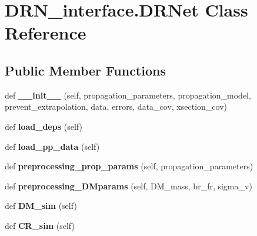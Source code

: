\hypertarget{classDRN__interface_1_1DRNet}{}\section{D\+R\+N\+\_\+interface.\+D\+R\+Net Class Reference}
\label{classDRN__interface_1_1DRNet}
\subsection*{Public Member Functions}
\begin{DoxyCompactItemize}
\item 
\mbox{\label{classDRN__interface_1_1DRNet_a24305a7981aef4f74f6ae0ae8a316218}} 
def {\bfseries \+\_\+\+\_\+init\+\_\+\+\_\+} (self, propagation\+\_\+parameters, propagation\+\_\+model, prevent\+\_\+extrapolation, data, errors, data\+\_\+cov, xsection\+\_\+cov)
\item 
\mbox{\label{classDRN__interface_1_1DRNet_a5e2c360fb9a3ee1b2399e85739d06f6e}} 
def {\bfseries load\+\_\+deps} (self)
\item 
\mbox{\label{classDRN__interface_1_1DRNet_aa9f81928007c8fe2e2311da0f92b7ce7}} 
def {\bfseries load\+\_\+pp\+\_\+data} (self)
\item 
\mbox{\label{classDRN__interface_1_1DRNet_a9c23b8aca67ca756aff057626dd0da0e}} 
def {\bfseries preprocessing\+\_\+prop\+\_\+params} (self, propagation\+\_\+parameters)
\item 
\mbox{\label{classDRN__interface_1_1DRNet_a7e6dd2cae3ae172c8f1ee45c5c7cb8a5}} 
def {\bfseries preprocessing\+\_\+\+D\+Mparams} (self, D\+M\+\_\+mass, br\+\_\+fr, sigma\+\_\+v)
\item 
\mbox{\label{classDRN__interface_1_1DRNet_a8c9f61720b59f809611c2ec1da32cdfe}} 
def {\bfseries D\+M\+\_\+sim} (self)
\item 
\mbox{\label{classDRN__interface_1_1DRNet_a324de5909cdf94169068dd6785a21d46}} 
def {\bfseries C\+R\+\_\+sim} (self)
\item 

\end{DoxyCompactItemize}
